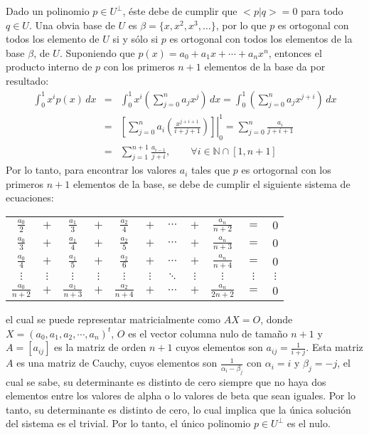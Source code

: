 \documentclass[a4paper,11pt]{article}
\theoremstyle{teoremas}
\theoremstyle{ejemplos}
\theoremstyle{definiciones}
\theoremstyle{lemas}
\begin{document}
Dado un polinomio $p \in U^{\perp}$, \'este debe de cumplir que $<p | q> = 0$ para todo $q \in U$. Una obvia base de $U$ es $\beta = \{ x, x^2, x^3, \ldots \}$, por lo que $p$ es ortogonal con todos los elemento de $U$ si y s\'olo si $p$ es ortogonal con todos los elementos de la base $\beta$, de $U$.
Suponiendo que $p(x) = a_0 + a_1x + \cdots + a_nx^n$, entonces el producto interno de $p$ con los primeros $n+1$ elementos de la base da por resultado:
\begin{eqnarray*}
 \int_{0}^{1} x^i p(x) \, dx 
 & = & \int_{0}^{1} x^i \left( \sum_{j=0}^{n} a_jx^j \right) \, dx = \int_{0}^{1} \left( \sum_{j=0}^{n} a_j x^{j+i}  \right) \, dx \\
 & = & \left. \left[ \sum_{j=0}^n a_i\left( \frac{x^{j+i+1}}{i+j+1} \right)  \right] \right|_{0}^{1} = \sum_{j=0}^{n} \frac{a_i}{j+i+1} \\
 & = & \sum_{j=1}^{n+1} \frac{a_{i-1}}{j+i}, \qquad \forall i \in \mathbb{N}\cap[1,n+1]
\end{eqnarray*}
Por lo tanto, para encontrar los valores $a_i$ tales que $p$ es ortogornal con los primeros $n+1$ elementos de la base, se debe de cumplir el siguiente sistema de ecuaciones:
\begin{center}
 \begin{tabular}{ccccccccccc}
  $\frac{a_0}{2}$ & $+$ & $\frac{a_1}{3}$ & $+$ & $\frac{a_2}{4}$ &  $+$ & $\cdots$ & $+$ & $\frac{a_n}{n+2}$ & $=$ & $0$ \\
  $\frac{a_0}{3}$ & $+$ & $\frac{a_1}{4}$ & $+$ & $\frac{a_2}{5}$ & $+$ & $\cdots$ & $+$ & $\frac{a_n}{n+3}$ & $=$ & $0$ \\
  $\frac{a_0}{4}$ & $+$ & $\frac{a_1}{5}$ & $+$ & $\frac{a_2}{6}$ & $+$ & $\cdots$ & $+$ & $\frac{a_n}{n+4}$ & $=$ & $0$ \\
  $\vdots$ & $\vdots$ & $\vdots$ & $\vdots$ & $\vdots$ & $\vdots$ & $\ddots$ & $\vdots$ & $\vdots$ & $\vdots$ & $\vdots$ \\
  $\frac{a_0}{n+2}$ & $+$ & $\frac{a_1}{n+3}$ & $+$ & $\frac{a_2}{n+4}$ & $+$ & $\cdots$ & $+$ & $\frac{a_n}{2n+2}$ & $=$ & $0$ \\
 \end{tabular}
\end{center}
el cual se puede representar matricialmente como $AX = O$, donde $X = (a_0, a_1, a_2, \cdots, a_n)^t$, $O$ es el vector columna nulo de tama\~no $n+1$ y $A = [a_{ij}]$ es la matriz de orden $n+1$ cuyos elementos son $a_{ij} = \frac{1}{i+j}$. Esta matriz $A$ es una matriz de Cauchy, cuyos elementos son $\frac{1}{\alpha_i - \beta_j}$ con $\alpha_i = i$ y $\beta_j = -j$, el cual se sabe, su determinante es distinto de cero siempre que no haya dos elementos entre los valores de alpha o lo valores de beta que sean iguales. Por lo tanto, su determinante es distinto de cero, lo cual implica que la \'unica soluci\'on del sistema es el trivial. Por lo tanto, el \'unico polinomio $p \in U^{\perp}$ es el nulo.
\end{document}
